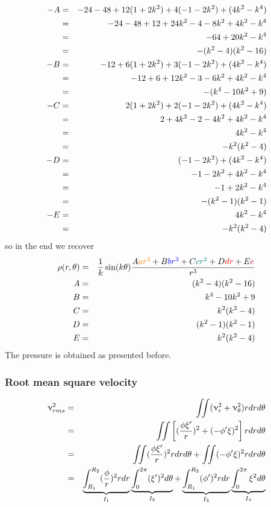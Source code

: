 \begin{eqnarray}
-A &=& -24 -48 +12(1+2k^2) + 4(- 1 -2k^2)+(4k^2 -k^4) \nonumber\\
  &=& -24 -48 +12 +24k^2 -4 -8k^2 +4k^2 - k^4 \nonumber\\
  &=& -64 +20k^2 -k^4 \nonumber\\
  &=& -(k^2-4)(k^2-16) \nonumber\\
-B &=& -12 + 6(1+2k^2) +3( - 1 -2k^2  ) + (4k^2 -k^4) \nonumber\\
  &=& -12 +6 + 12k^2 -3-6k^2 + 4k^2 - k^4 \nonumber\\
  &=& -(k^4 -10k^2 +9)  \nonumber\\
-C &=& 2(1+2k^2) + 2( - 1 -2k^2  ) + (4k^2 -k^4)\nonumber \\
  &=& 2 + 4k^2 -2 -4k^2 + 4k^2 -k^4 \nonumber\\
  &=& 4k^2 -k^4 \nonumber\\
  &=& -k^2(k^2-4) \nonumber\\
-D &=& ( - 1 -2k^2  ) + (4k^2 -k^4) \nonumber\\
  &=& -1 -2k^2 +4k^2 -k^4 \nonumber\\
  &=& -1 +2k^2 -k^4 \nonumber\\
  &=& -(k^2-1)(k^2-1) \nonumber\\
-E &=&  4k^2 -k^4 \nonumber\\
  &=& -k^2 (k^2-4) \nonumber
\end{eqnarray}
so in the end we recover
\begin{eqnarray}
\rho(r,\theta) &=& \frac{1}{k}\sin (k\theta) 
\frac{
A{\color{orange} ar^4}+
B{\color{blue} br^3}+
C{\color{teal}c r^2} +
D {\color{red}dr}+
E{\color{purple}e}
}{r^3}
\nonumber\\
A &=& (k^2-4)(k^2-16)\nonumber \\
B &=& k^4-10k^2+9\nonumber    \\
C &=& k^2(k^2-4)  \nonumber    \\
D &=& (k^2-1)(k^2-1) \nonumber     \\
E &=& k^2(k^2-4) \nonumber
\end{eqnarray}
The pressure is obtained as presented before.


\subsubsection*{Root mean square velocity}

\begin{eqnarray}
\upnu_{rms}^2 
&=&  \iint (\upnu_r^2 + \upnu_\theta^2) r drd\theta \nonumber\\
&=&  \iint \left[ 
(\frac{\phi \xi'}{r})^2 + ( -\phi' \xi)^2
\right] r drd\theta \nonumber\\
&=&  \iint (\frac{\phi \xi'}{r})^2 rdrd\theta
+ \iint (-\phi' \xi)^2 r drd\theta \nonumber\\
&=&  \underbrace{\int_{R_1}^{R_2} (\frac{\phi }{r})^2 rdr}_{I_1}
\underbrace{\int_0^{2\pi} (\xi')^2  d\theta}_{I_2}
+
\underbrace{\int_{R_1}^{R_2} (\phi') ^2 r dr}_{I_3} 
\underbrace{\int_0^{2\pi} \xi^2  d\theta}_{I_4} \nonumber
\end{eqnarray}

